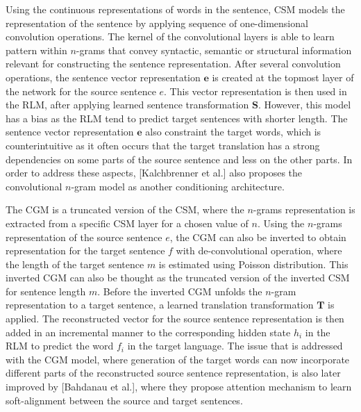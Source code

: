 \documentclass[12pt]{extarticle}
\begin{document}
Using the continuous representations of words in the sentence, CSM models the representation of the sentence by applying sequence of one-dimensional convolution operations. The kernel of the convolutional layers is able to learn pattern within $n$-grams that convey syntactic, semantic or structural information relevant for constructing the sentence representation. After several convolution operations, the sentence vector representation $\textbf{e}$ is created at the topmost layer of the network for the source sentence $e$. This vector representation is then used in the RLM, after applying learned sentence transformation $\textbf{S}$. However, this model has a bias as the RLM tend to predict target sentences with shorter length. The sentence vector representation $\textbf{e}$ also constraint the target words, which is counterintuitive as it often occurs that the target translation has a strong dependencies on some parts of the source sentence and less on the other parts. In order to address these aspects, [Kalchbrenner et al.] also proposes the convolutional $n$-gram model as another conditioning architecture.

The CGM is a truncated version of the CSM, where the $n$-grams representation is extracted from a specific CSM layer for a chosen value of $n$. Using the $n$-grams representation of the source sentence $e$, the CGM can also be inverted to obtain representation for the target sentence $f$ with de-convolutional operation, where the length of the target sentence $m$ is estimated using Poisson distribution. This inverted CGM can also be thought as the truncated version of the inverted CSM for sentence length $m$. Before the inverted CGM unfolds the $n$-gram representation to a target sentence, a learned translation transformation $\textbf{T}$ is applied. The reconstructed vector for the source sentence representation is then added in an incremental manner to the corresponding hidden state $h_{i}$ in the RLM to predict the word $f_{i}$ in the target language. The issue that is addressed with the CGM model, where generation of the target words can now incorporate different parts of the reconstructed source sentence representation, is also later improved by [Bahdanau et al.], where they propose attention mechanism to learn soft-alignment between the source and target sentences.
\end{document}
